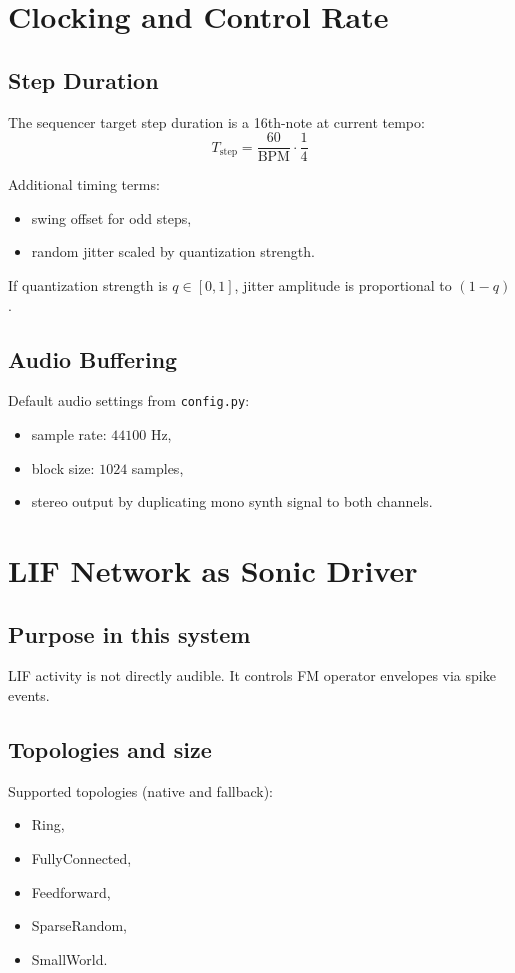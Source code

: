 \documentclass[11pt,a4paper]{article}
\begin{document}
\section{Clocking and Control Rate}
\subsection{Step Duration}
The sequencer target step duration is a 16th-note at current tempo:
\begin{equation}
T_{\mathrm{step}} = \frac{60}{\mathrm{BPM}} \cdot \frac{1}{4}
\end{equation}

Additional timing terms:
\begin{itemize}
    \item swing offset for odd steps,
    \item random jitter scaled by quantization strength.
\end{itemize}

If quantization strength is $q \in [0,1]$, jitter amplitude is proportional to $(1-q)$.

\subsection{Audio Buffering}
Default audio settings from \texttt{config.py}:
\begin{itemize}
    \item sample rate: $44100$ Hz,
    \item block size: $1024$ samples,
    \item stereo output by duplicating mono synth signal to both channels.
\end{itemize}

\section{LIF Network as Sonic Driver}
\subsection{Purpose in this system}
LIF activity is not directly audible. It controls FM operator envelopes via spike events.

\subsection{Topologies and size}
Supported topologies (native and fallback):
\begin{itemize}
    \item Ring,
    \item FullyConnected,
    \item Feedforward,
    \item SparseRandom,
    \item SmallWorld.
\end{itemize}
\end{document}
